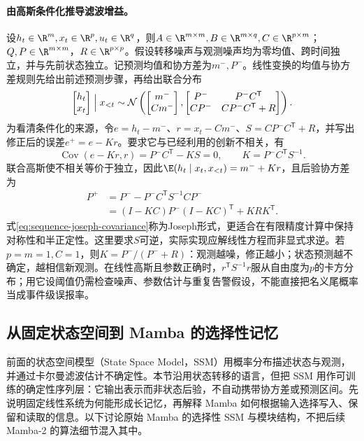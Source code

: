 \paragraph{由高斯条件化推导滤波增益。}
设$h_t\in\R^m,x_t\in\R^p,u_t\in\R^q$，则$A\in\R^{m\times m},B\in\R^{m\times q},C\in\R^{p\times m}$；$Q,P\in\R^{m\times m}$，$R\in\R^{p\times p}$。假设转移噪声与观测噪声均为零均值、跨时间独立，并与先前状态独立。记预测均值和协方差为$m^-,P^-$。线性变换的均值与协方差规则先给出前述预测步骤，再给出联合分布
\begin{equation}
 \begin{bmatrix}h_t\\x_t\end{bmatrix}\Bigm|x_{<t}
 \sim\mathcal N\left(
 \begin{bmatrix}m^-\\Cm^-\end{bmatrix},
 \begin{bmatrix}P^-&P^-C^{\mathsf T}\\CP^-&CP^-C^{\mathsf T}+R\end{bmatrix}\right).
\end{equation}
为看清条件化的来源，令$e=h_t-m^-$、$r=x_t-Cm^-$、$S=CP^-C^{\mathsf T}+R$，并写出修正后的误差$e^+=e-Kr$。要求它与已经利用的创新不相关，有
\begin{equation}
 \operatorname{Cov}(e-Kr,r)=P^-C^{\mathsf T}-KS=0,
 \qquad K=P^-C^{\mathsf T}S^{-1}.
\end{equation}
联合高斯使不相关等价于独立，因此$\E(h_t\mid x_t,x_{<t})=m^-+Kr$，且后验协方差为
\begin{align}
 P^+&=P^--P^-C^{\mathsf T}S^{-1}CP^-\\
 &=(I-KC)P^-(I-KC)^{\mathsf T}+KRK^{\mathsf T}.\label{eq:sequence-joseph-covariance}
\end{align}
式\eqref{eq:sequence-joseph-covariance}称为Joseph形式，更适合在有限精度计算中保持对称性和半正定性。这里要求$S$可逆，实际实现应解线性方程而非显式求逆。若$p=m=1,C=1$，则$K=P^-/(P^-+R)$：观测越噪，修正越小；状态预测越不确定，越相信新观测。在线性高斯且参数正确时，$r^{\mathsf T}S^{-1}r$服从自由度为$p$的卡方分布；用它设阈值仍需检查噪声、参数估计与重复告警假设，不能直接把名义尾概率当成事件级误报率。

\subsection{从固定状态空间到 Mamba 的选择性记忆}
\label{sec:sequence-mamba}
前面的状态空间模型（State Space Model，SSM）用概率分布描述状态与观测，并通过卡尔曼滤波估计不确定性。本节沿用状态转移的语言，但把 SSM 用作可训练的确定性序列层：它输出表示而非状态后验，不自动携带协方差或预测区间。先说明固定线性系统为何能形成长记忆，再解释 Mamba 如何根据输入选择写入、保留和读取的信息。以下讨论原始 Mamba 的选择性 SSM 与模块结构，不把后续 Mamba-2 的算法细节混入其中。

